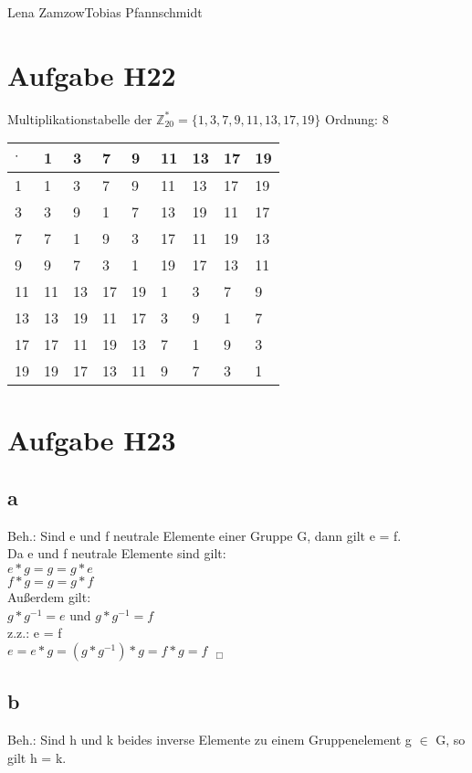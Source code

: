 \documentclass[11pt,a4paper]{article}
\begin{document}
                {Lena Zamzow}{Tobias Pfannschmidt}{}{}{}


\section*{Aufgabe H22}
Multiplikationstabelle der $\mathbb{Z}^{*}_{20} = \{1,3,7,9,11,13,17,19\}$ Ordnung: 8\\
\begin{center}
	\begin{tabular}{ | l | l | l | l | l | l | l| l|l}
		\hline
		$\cdot$&1&3&7&9&11&13&17&19 \\ \hline \hline		
		1&1&3&7&9&11&13&17&19 \\ \hline 	
		3&3&9&1&7&13&19&11&17 \\ \hline
		7&7&1&9&3&17&11&19&13\\ \hline	
		9&9&7&3&1&19&17&13&11 \\ \hline
		11&11&13&17&19&1&3&7&9 \\ \hline
		13&13&19&11&17&3&9&1&7 \\ \hline
		17&17&11&19&13&7&1&9&3 \\ \hline
		19&19&17&13&11&9&7&3&1 \\ \hline 
	\end{tabular}
\end{center}
\section*{Aufgabe H23}
\subsection*{a}
Beh.: Sind e und f neutrale Elemente einer Gruppe G, dann gilt e = f. \\

Da e und f neutrale Elemente sind gilt: \\
$e \ast g = g = g \ast e$ \\
$f \ast g = g = g \ast f$ \\
Außerdem gilt: \\
$g \ast g^{-1} = e$ und $g \ast g^{-1} = f$ \\

z.z.: e = f \\
$ e = e \ast g = (g \ast g^{-1}) \ast  g = f \ast  g = f ~~~_\Box$

\subsection*{b}
Beh.: Sind h und k beides inverse Elemente zu einem Gruppenelement g $\in$ G, so gilt h = k. \\
\end{document}
